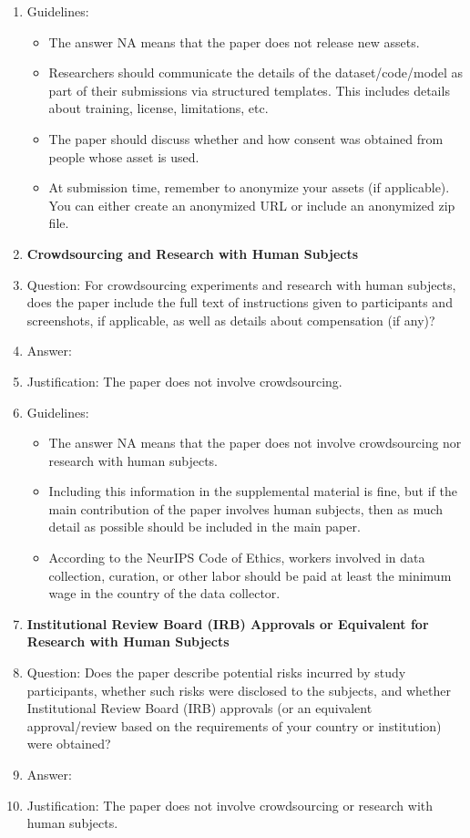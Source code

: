 \documentclass{article}
\begin{document}
\begin{enumerate}
    \item[] Guidelines:
    \begin{itemize}
        \item The answer NA means that the paper does not release new assets.
        \item Researchers should communicate the details of the dataset/code/model as part of their submissions via structured templates. This includes details about training, license, limitations, etc. 
        \item The paper should discuss whether and how consent was obtained from people whose asset is used.
        \item At submission time, remember to anonymize your assets (if applicable). You can either create an anonymized URL or include an anonymized zip file.
    \end{itemize}

\item {\bf Crowdsourcing and Research with Human Subjects}
    \item[] Question: For crowdsourcing experiments and research with human subjects, does the paper include the full text of instructions given to participants and screenshots, if applicable, as well as details about compensation (if any)? 
    \item[] Answer: \answerNA{} %
    \item[] Justification: The paper does not involve crowdsourcing.
     
    \item[] Guidelines:
    \begin{itemize}
        \item The answer NA means that the paper does not involve crowdsourcing nor research with human subjects.
        \item Including this information in the supplemental material is fine, but if the main contribution of the paper involves human subjects, then as much detail as possible should be included in the main paper. 
        \item According to the NeurIPS Code of Ethics, workers involved in data collection, curation, or other labor should be paid at least the minimum wage in the country of the data collector. 
    \end{itemize}

\item {\bf Institutional Review Board (IRB) Approvals or Equivalent for Research with Human Subjects}
    \item[] Question: Does the paper describe potential risks incurred by study participants, whether such risks were disclosed to the subjects, and whether Institutional Review Board (IRB) approvals (or an equivalent approval/review based on the requirements of your country or institution) were obtained?
    \item[] Answer: \answerNA{} %
    \item[] Justification: The paper does not involve crowdsourcing or research with human subjects.
      

\end{enumerate}
\end{document}
